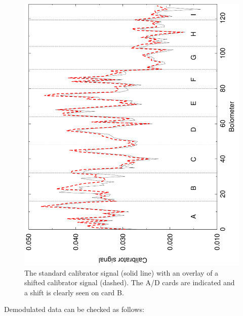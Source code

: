 \documentclass[twoside,11pt]{starlink}
\begin{document}
\begin{figure}
\begin{center}
\includegraphics[width=5in,angle=-90]{sun216_shift_diag}
\caption{The standard calibrator signal (solid line) with an overlay of a
shifted calibrator signal (dashed). The A/D cards are indicated and a shift
is clearly seen on card B.}
\label{scushift_fig}
\end{center}
\end{figure}


Demodulated data can be checked as follows:
\end{document}
